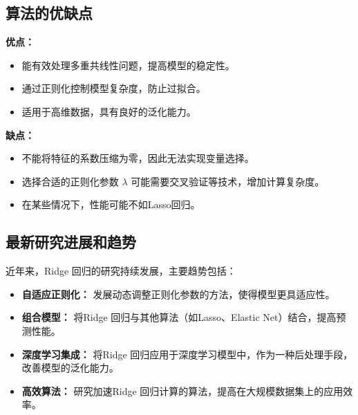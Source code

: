 \subsection*{算法的优缺点}
\textbf{优点：}
\begin{itemize}
    \item 能有效处理多重共线性问题，提高模型的稳定性。
    \item 通过正则化控制模型复杂度，防止过拟合。
    \item 适用于高维数据，具有良好的泛化能力。
\end{itemize}

\textbf{缺点：}
\begin{itemize}
    \item 不能将特征的系数压缩为零，因此无法实现变量选择。
    \item 选择合适的正则化参数 \(\lambda\) 可能需要交叉验证等技术，增加计算复杂度。
    \item 在某些情况下，性能可能不如Lasso回归。
\end{itemize}

\subsection*{最新研究进展和趋势}
近年来，Ridge 回归的研究持续发展，主要趋势包括：
\begin{itemize}
    \item \textbf{自适应正则化：} 发展动态调整正则化参数的方法，使得模型更具适应性。
    \item \textbf{组合模型：} 将Ridge 回归与其他算法（如Lasso、Elastic Net）结合，提高预测性能。
    \item \textbf{深度学习集成：} 将Ridge 回归应用于深度学习模型中，作为一种后处理手段，改善模型的泛化能力。
    \item \textbf{高效算法：} 研究加速Ridge 回归计算的算法，提高在大规模数据集上的应用效率。
\end{itemize}

